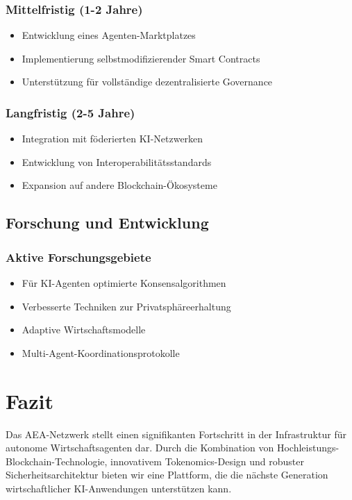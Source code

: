 \documentclass[12pt,a4paper]{article}
\begin{document}
\subsubsection{Mittelfristig (1-2 Jahre)}
\begin{itemize}
\item Entwicklung eines Agenten-Marktplatzes
\item Implementierung selbstmodifizierender Smart Contracts
\item Unterstützung für vollständige dezentralisierte Governance
\end{itemize}

\subsubsection{Langfristig (2-5 Jahre)}
\begin{itemize}
\item Integration mit föderierten KI-Netzwerken
\item Entwicklung von Interoperabilitätsstandards
\item Expansion auf andere Blockchain-Ökosysteme
\end{itemize}

\subsection{Forschung und Entwicklung}

\subsubsection{Aktive Forschungsgebiete}
\begin{itemize}
\item Für KI-Agenten optimierte Konsensalgorithmen
\item Verbesserte Techniken zur Privatsphäreerhaltung
\item Adaptive Wirtschaftsmodelle
\item Multi-Agent-Koordinationsprotokolle
\end{itemize}

\section{Fazit}

Das AEA-Netzwerk stellt einen signifikanten Fortschritt in der Infrastruktur für autonome Wirtschaftsagenten dar. Durch die Kombination von Hochleistungs-Blockchain-Technologie, innovativem Tokenomics-Design und robuster Sicherheitsarchitektur bieten wir eine Plattform, die die nächste Generation wirtschaftlicher KI-Anwendungen unterstützen kann.
\end{document}
